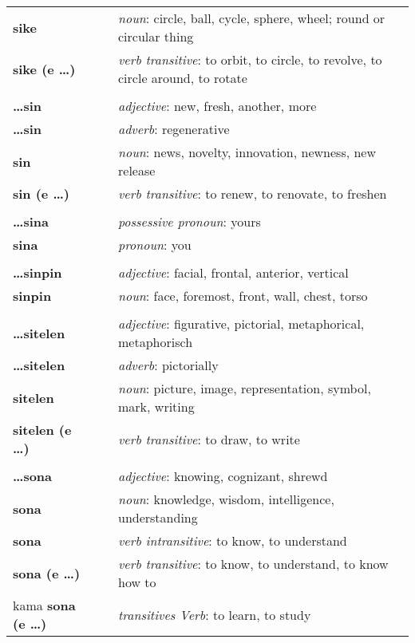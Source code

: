 \begin{supertabular}{p{2,5cm}|ll}
\textbf{sike} && \textit{noun}: circle, ball, cycle, sphere, wheel; round or circular thing \\ 
\textbf{sike (e \dots)} && \textit{verb transitive}: to orbit, to circle, to revolve, to circle around, to rotate \\ 
 && \\ %
\textbf{\dots sin} && \textit{adjective}: new, fresh, another, more \\ 
\textbf{ \dots sin } && \textit{adverb}: regenerative \\ 
\textbf{sin} && \textit{noun}: news, novelty, innovation, newness, new release \\ 
\textbf{sin (e \dots)} && \textit{verb transitive}: to renew, to renovate, to freshen \\ 
 && \\ %
\textbf{\dots sina} && \textit{possessive pronoun}: yours \\  
\textbf{sina} && \textit{pronoun}: you \\ 
 && \\ %
\textbf{\dots sinpin} && \textit{adjective}: facial, frontal, anterior, vertical \\ 
\textbf{sinpin} && \textit{noun}: face, foremost, front, wall, chest, torso \\ 
 && \\ %
\textbf{\dots sitelen} && \textit{adjective}: figurative, pictorial, metaphorical, metaphorisch \\ 
\textbf{\dots sitelen} && \textit{adverb}: pictorially \\ 
\textbf{sitelen} && \textit{noun}: picture, image, representation, symbol, mark, writing \\ 
\textbf{sitelen (e \dots)} && \textit{verb transitive}: to draw, to write \\ 
 && \\ %
\textbf{\dots sona} && \textit{adjective}: knowing, cognizant, shrewd \\ 
\textbf{sona} && \textit{noun}: knowledge, wisdom, intelligence, understanding \\ 
\textbf{sona} && \textit{verb intransitive}: to know, to understand \\ 
\textbf{sona (e \dots)} && \textit{verb transitive}: to know, to understand, to know how to \\ 
kama \textbf{sona (e \dots)} && \textit{transitives Verb}: to learn, to study \\ 

\end{supertabular}
